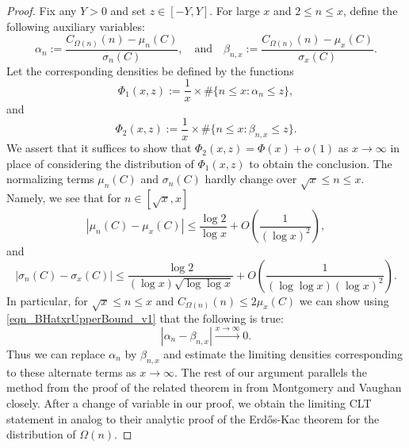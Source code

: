 \documentclass[11pt,reqno,a4letter]{article}
\numberwithin{figure}{section}
\numberwithin{table}{section}
\theoremstyle{plain}
\numberwithin{theorem}{section}
\theoremstyle{definition}
\begin{document}
\begin{proof} 
Fix any $Y > 0$ and set $z \in [-Y, Y]$. 
For large $x$ and $2 \leq n \leq x$, define the following auxiliary variables: 
\[
\alpha_n := \frac{C_{\Omega(n)}(n) - \mu_n(C)}{\sigma_n(C)}, \quad\mathrm{and}\quad 
     \beta_{n,x} := \frac{C_{\Omega(n)}(n) - \mu_x(C)}{\sigma_x(C)}. 
\] 
Let the corresponding densities be defined by the functions 
\[
\Phi_1(x, z) := \frac{1}{x} \times \#\{n \leq x: \alpha_n \leq z\}, 
\]
and 
\[
\Phi_2(x, z) := \frac{1}{x} \times \#\{n \leq x: \beta_{n,x} \leq z\}. 
\] 
We assert that it suffices to show that $\Phi_2(x, z) = \Phi(x) + o(1)$ as 
$x \rightarrow \infty$ in place of considering the distribution of 
$\Phi_1(x, z)$ to obtain the conclusion. 
The normalizing terms $\mu_n(C)$ and $\sigma_n(C)$ hardly change over 
$\sqrt{x} \leq n \leq x$. Namely, we see that for $n \in [\sqrt{x}, x]$
\[
|\mu_n(C) - \mu_x(C)| \leq 
     \frac{\log 2}{\log x} + 
     O\left(\frac{1}{(\log x)^2}\right), 
\]
and 
\[
|\sigma_n(C) - \sigma_x(C)| 
     \leq \frac{\log 2}{(\log x) \sqrt{\log\log x}} + O\left( 
     \frac{1}{(\log\log x) (\log x)^2}\right). 
\]
In particular, for 
$\sqrt{x} \leq n \leq x$ and $C_{\Omega(n)}(n) \leq 2 \mu_x(C)$ we can show 
using \eqref{eqn_BHatxrUpperBound_v1} 
that the following is true: 
\[
|\alpha_n - \beta_{n,x}| \xrightarrow{x \rightarrow \infty} 0. 
\]
Thus we can replace $\alpha_n$ by $\beta_{n,x}$ and estimate the limiting 
densities corresponding to these alternate terms as $x \rightarrow \infty$. 
The rest of our argument parallels the method from the proof of the related theorem in 
\cite[Thm.\ 7.21; \S 7.4]{MV} from Montgomery and Vaughan closely. 
After a change of variable in our proof, we obtain the limiting 
CLT statement in analog to their analytic proof of the Erd\H{o}s-Kac theorem 
for the distribution of $\Omega(n)$. 


\end{proof}
\end{document}
